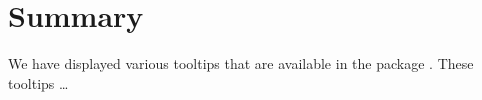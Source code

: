 \hypertarget{summary}{%
\section{Summary}\label{summary}}

We have displayed various tooltips that are available in the package
. These tooltips \ldots{}



\address{%
Quietest Quokka\\
University of Little Mates\\%
Department of Letter Q\\ Somewhere, Australia\\
%
\url{https://www.britannica.com/animal/quokka}%
\\\textit{ORCiD: \href{https://orcid.org/0000-1721-1511-1101}{0000-1721-1511-1101}}%
\\\href{mailto:qquo@ulm.edu}{\nolinkurl{qquo@ulm.edu}}
}

\address{%
Bounciest Bilby\\
University of Little Mates\\%
Department of Letter B\\ Somewhere, Australia\\
%
\url{https://www.britannica.com/animal/bilby}%
\\\textit{ORCiD: \href{https://orcid.org/0000-0002-0912-0225}{0000-0002-0912-0225}}%
\\\href{mailto:bbil@ulm.edu}{\nolinkurl{bbil@ulm.edu}}
}
